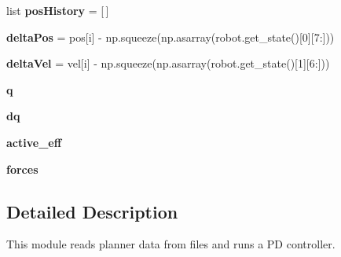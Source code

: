 \begin{DoxyCompactItemize}
list {\bfseries pos\+History} = \mbox{[}$\,$\mbox{]}
\item 
\mbox{\label{namespacerobot__properties__bolt_1_1pd_a9a39a51b2f763e8a21ef887e9e3d9798}} 
{\bfseries delta\+Pos} = pos\mbox{[}i\mbox{]} -\/ np.\+squeeze(np.\+asarray(robot.\+get\+\_\+state()\mbox{[}0\mbox{]}\mbox{[}7\+:\mbox{]}))
\item 
\mbox{\label{namespacerobot__properties__bolt_1_1pd_aba4eaf4c107132793a0b485aefaaafeb}} 
{\bfseries delta\+Vel} = vel\mbox{[}i\mbox{]} -\/ np.\+squeeze(np.\+asarray(robot.\+get\+\_\+state()\mbox{[}1\mbox{]}\mbox{[}6\+:\mbox{]}))
\item 
\mbox{\label{namespacerobot__properties__bolt_1_1pd_a34cb69b502b8932afd00a74d722f6f35}} 
{\bfseries q}
\item 
\mbox{\label{namespacerobot__properties__bolt_1_1pd_a0a1e0aab2ba1ec88672f657be05c1ae5}} 
{\bfseries dq}
\item 
\mbox{\label{namespacerobot__properties__bolt_1_1pd_aa6415397e803d7de4f890a0a81c65485}} 
{\bfseries active\+\_\+eff}
\item 
\mbox{\label{namespacerobot__properties__bolt_1_1pd_aedae664053ed1b910c01d24ec83dda9f}} 
{\bfseries forces}
\end{DoxyCompactItemize}


\subsection{Detailed Description}
This module reads planner data from files and runs a PD controller. 